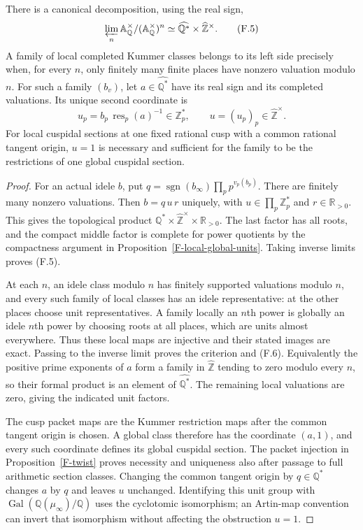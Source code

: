 \begin{proposition}
\label{F-ideles}
There is a canonical decomposition, using the real sign,
\[
 \varprojlim_n\mathbb A_{\mathbb Q}^{\times}/
                   (\mathbb A_{\mathbb Q}^{\times})^n
 \simeq\widehat{\mathbb Q^*}\times\widehat{\mathbb Z}^{\times}.
                                                                  \tag{F.5}
\]
A family of local completed Kummer classes belongs to its left
side precisely when, for every $n$, only finitely many finite
places have nonzero valuation modulo $n$. For such a family
$(b_v)$, let $a\in\widehat{\mathbb Q^*}$ have its real sign
and its completed valuations. Its unique second coordinate is
\[
 u_p=b_p\,\operatorname{res}_p(a)^{-1}\in\mathbb Z_p^*,
 \qquad u=(u_p)_p\in\widehat{\mathbb Z}^{\times}.             \tag{F.6}
\]
For local cuspidal sections at one fixed rational cusp with a
common rational tangent origin, $u=1$ is necessary and sufficient
for the family to be the restrictions of one global cuspidal
section.
\end{proposition}
\begin{proof}
For an actual idele $b$, put
$q=\operatorname{sgn}(b_\infty)\prod_p p^{v_p(b_p)}$.
There are finitely many nonzero valuations. Then
$b=q\,u\,r$ uniquely, with $u\in\prod_p\mathbb Z_p^*$
and $r\in\mathbb R_{>0}$. This gives the topological product
$\mathbb Q^*\times\widehat{\mathbb Z}^{\times}\times
\mathbb R_{>0}$. The last factor has all roots, and the compact
middle factor is complete for power quotients by the compactness
argument in Proposition~\ref{F-local-global-units}. Taking
inverse limits proves (F.5).

At each $n$, an idele class modulo $n$ has finitely supported
valuations modulo $n$, and every such family of local classes
has an idele representative: at the other places choose unit
representatives. A family locally an $n$th power is globally an
idele $n$th power by choosing roots at all places, which are
units almost everywhere. Thus these local maps are injective
and their stated images are exact. Passing to the inverse limit
proves the criterion and (F.6). Equivalently the positive prime
exponents of $a$ form a family in $\widehat{\mathbb Z}$ tending
to zero modulo every $n$, so their formal product is an element
of $\widehat{\mathbb Q^*}$. The remaining local valuations are
zero, giving the indicated unit factors.

The cusp packet maps are the Kummer restriction maps after the
common tangent origin is chosen. A global class therefore has
the coordinate $(a,1)$, and every such coordinate defines its
global cuspidal section. The packet injection in
Proposition~\ref{F-twist} proves necessity and uniqueness also
after passage to full arithmetic section classes. Changing the
common tangent origin by $q\in\mathbb Q^*$ changes $a$ by $q$
and leaves $u$ unchanged. Identifying this unit group with
$\operatorname{Gal}(\mathbb Q(\mu_\infty)/\mathbb Q)$ uses
the cyclotomic isomorphism; an Artin-map convention can invert
that isomorphism without affecting the obstruction $u=1$.
\end{proof}


